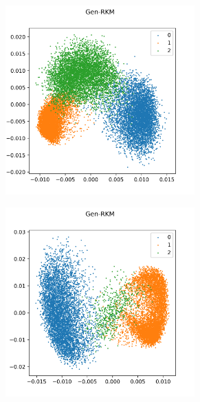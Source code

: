 



\begin{figure}[H]
    \centering
    \begin{subfigure}{0.45\textwidth}
        \centering
        \includegraphics[width=0.8\textwidth]{Figures/PS_v2/rkm-bMNIST012-latentspace-vis.png}
    \end{subfigure}
    \hfill
    \begin{subfigure}{0.45\textwidth}
        \centering
        \includegraphics[width=0.8\textwidth]{Figures/PS_v2/rkm-ubMNIST012-latentspace-vis.png}

\end{subfigure}
\end{figure}

